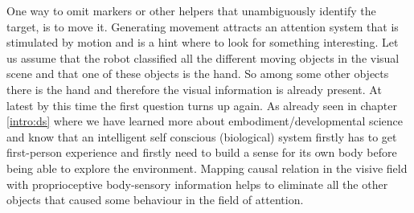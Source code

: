 \documentclass[conference]{IEEEtran}
\begin{document}
One way to omit markers or other helpers that unambiguously identify the target, is to move it. Generating movement attracts an attention system that is stimulated by motion and is a hint where to look for something interesting. Let us assume that the robot classified all the different moving objects in the visual scene and that one of these objects is the hand. So among some other objects there is the hand and therefore the visual information is already present. At latest by this time the first question turns up again. As already seen in chapter \ref{intro:ds} where we have learned more about embodiment/developmental science and know that an intelligent self conscious (biological) system firstly has to get first-person experience \cite{ADAP03} and firstly need to build a sense for its own body \cite{DERBS04-02} before being able to explore the environment. Mapping causal relation in the visive field with proprioceptive body-sensory information helps to eliminate all the other objects that caused some behaviour in the field of attention.
\end{document}
